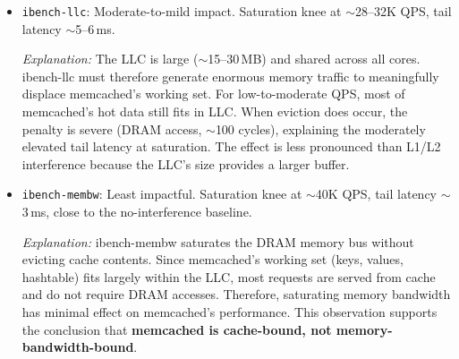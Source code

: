 \begin{itemize}
    \textit{Explanation:} L2 cache is larger than L1 ($\sim$256\,KB--1\,MB per core),
    so ibench-l2 must generate much higher memory pressure to cause significant
    evictions of memcached's working set. Memcached can still keep its most critical
    data in L1, partially shielding itself. When an L2 miss does occur, the penalty
    is higher (data must be fetched from LLC), but this happens less frequently than
    with L1 interference, resulting in a milder overall effect.

    \item \texttt{ibench-llc}: Moderate-to-mild impact. Saturation knee at
    $\sim$28--32K QPS, tail latency $\sim$5--6\,ms.

    \textit{Explanation:} The LLC is large ($\sim$15--30\,MB) and shared across all
    cores. ibench-llc must therefore generate enormous memory traffic to meaningfully
    displace memcached's working set. For low-to-moderate QPS, most of memcached's
    hot data still fits in LLC. When eviction does occur, the penalty is severe
    (DRAM access, $\sim$100 cycles), explaining the moderately elevated tail latency
    at saturation. The effect is less pronounced than L1/L2 interference because the
    LLC's size provides a larger buffer.

    \item \texttt{ibench-membw}: Least impactful. Saturation knee at $\sim$40K QPS,
    tail latency $\sim$3\,ms, close to the no-interference baseline.

    \textit{Explanation:} ibench-membw saturates the DRAM memory bus without
    evicting cache contents. Since memcached's working set (keys, values, hashtable)
    fits largely within the LLC, most requests are served from cache and do not require
    DRAM accesses. Therefore, saturating memory bandwidth has minimal effect on
    memcached's performance. This observation supports the conclusion that
    \textbf{memcached is cache-bound, not memory-bandwidth-bound}.
\end{itemize}


